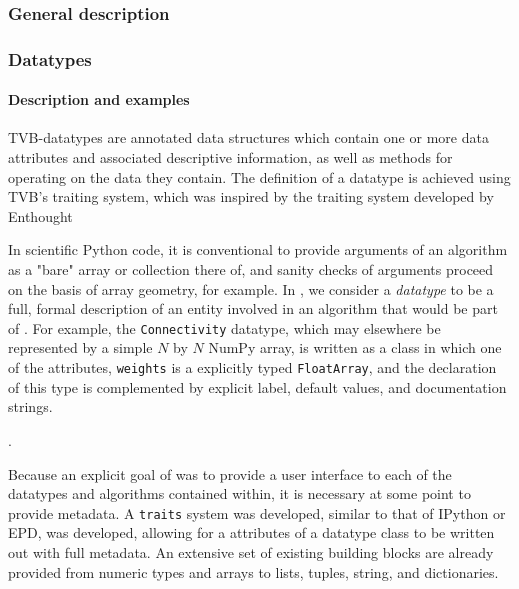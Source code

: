 	\subsubsection{General description}

	\subsubsection{Datatypes}

\paragraph{Description and examples}

 TVB-datatypes are annotated data structures which
contain one or more data attributes and associated descriptive information, as
well as methods for operating on the data they contain. The definition of a
datatype is achieved using TVB's traiting system, which was inspired by the
traiting system developed by Enthought \cite{Enthought_2001} 



In scientific Python code, it is conventional to provide arguments
of an algorithm as a "bare" array or collection there of, and sanity
checks of arguments proceed on the basis of array geometry, for example.
In \TVB, we consider a \textit{datatype} to be a full, formal description of 
an entity involved in an algorithm that would be part of \TVB. 
For example, the \texttt{Connectivity} datatype, which may elsewhere
be represented by a simple $N$ by $N$ NumPy array, is written as a class
in which one of the attributes, \texttt{weights} is a explicitly typed 
\texttt{FloatArray}, and the declaration of this type is complemented by
explicit label, default values, and documentation strings. 

.

Because an explicit goal of \TVB was to provide a user interface to each of the
datatypes and algorithms contained within, it is necessary at some point to
provide metadata. A \texttt{traits} system was developed, similar to that of
IPython or EPD, was developed, allowing for a attributes of a datatype class to
be written out with full metadata. An extensive set of existing building 
blocks are already provided from numeric types and arrays to lists, tuples, 
string, and dictionaries.

